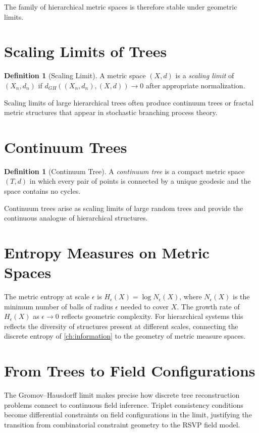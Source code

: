 \documentclass[12pt,a4paper,oneside]{book}
\numberwithin{equation}{chapter}
\theoremstyle{plain}
\theoremstyle{definition}
\newtheorem{definition}[theorem]{Definition}
\theoremstyle{remark}
\begin{document}
The family of hierarchical metric spaces is therefore stable under
geometric limits.

\section{Scaling Limits of Trees}

\begin{definition}[Scaling Limit]
A metric space $(X,d)$ is a \emph{scaling limit} of $(X_n,d_n)$ if
$d_{GH}((X_n,d_n),(X,d)) \to 0$ after appropriate normalization.
\end{definition}

Scaling limits of large hierarchical trees often produce continuum
trees or fractal metric structures that appear in stochastic branching
process theory.

\section{Continuum Trees}

\begin{definition}[Continuum Tree]
A \emph{continuum tree} is a compact metric space $(T,d)$ in which
every pair of points is connected by a unique geodesic and the space
contains no cycles.
\end{definition}

Continuum trees arise as scaling limits of large random trees and
provide the continuous analogue of hierarchical structures.

\section{Entropy Measures on Metric Spaces}

The metric entropy at scale $\epsilon$ is
$H_\epsilon(X) = \log N_\epsilon(X)$,
where $N_\epsilon(X)$ is the minimum number of balls of radius
$\epsilon$ needed to cover $X$. The growth rate of $H_\epsilon(X)$
as $\epsilon \to 0$ reflects geometric complexity. For hierarchical
systems this reflects the diversity of structures present at
different scales, connecting the discrete entropy of
\cref{ch:information} to the geometry of metric measure spaces.

\section{From Trees to Field Configurations}

The Gromov--Hausdorff limit makes precise how discrete tree
reconstruction problems connect to continuous field inference. Triplet
consistency conditions become differential constraints on field
configurations in the limit, justifying the transition from
combinatorial constraint geometry to the RSVP field model.
\end{document}
